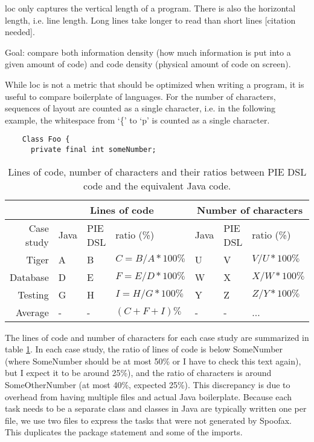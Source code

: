 \Ac{loc} only captures the vertical length of a program.
There is also the horizontal length, i.e. line length.
Long lines take longer to read than short lines [citation needed].


Goal: compare both information density (how much information is put into a given amount of code) and code density (physical amount of code on screen).

While \ac{loc} is not a metric that should be optimized when writing a program, it is useful to compare boilerplate of languages.
For the number of characters, sequences of layout are counted as a single character, i.e. in the following example, the whitespace from `\{' to `p' is counted as a single character.
\begin{lstlisting}
    Class Foo {
      private final int someNumber;
\end{lstlisting}


\begin{table}
  \caption{Lines of code, number of characters and their ratios between \ac{PIE} \ac{DSL} code and the equivalent Java code.}
  \label{tbl:evaluation_analysis_loc}
  \begin{tabular}{|r||l|l|l||l|l|l|}
    \hline
    & \multicolumn{3}{|c||}{Lines of code} & \multicolumn{3}{|c|}{Number of characters} \\
    \hline
    Case study & Java & \ac{PIE} \ac{DSL} & ratio (\%) & Java & \ac{PIE} \ac{DSL} & ratio (\%) \\
    \hline
    \hline
    Tiger & A & B & $C = B / A * 100\%$ & U & V & $V / U * 100\%$ \\
    Database & D & E & $F = E / D * 100\%$ & W & X & $X / W * 100\%$ \\
    Testing & G & H & $I = H / G * 100\%$ & Y & Z & $Z / Y * 100\%$ \\
    \hline
    Average & - & - & $(C + F + I)\%$ & - & - & ... \\
    \hline
  \end{tabular}
\end{table}

The lines of code and number of characters for each case study are summarized in table \ref{tbl:evaluation_analysis_loc}.
In each case study, the ratio of lines of code is below SomeNumber (where SomeNumber should be at most 50\% or I have to check this text again), but I expect it to be around 25\%), and the ratio of characters is around SomeOtherNumber (at most 40\%, expected 25\%).
This discrepancy is due to overhead from having multiple files and actual Java boilerplate.
Because each task needs to be a separate class and classes in Java are typically written one per file, we use two files to express the tasks that were not generated by Spoofax.
This duplicates the package statement and some of the imports.

